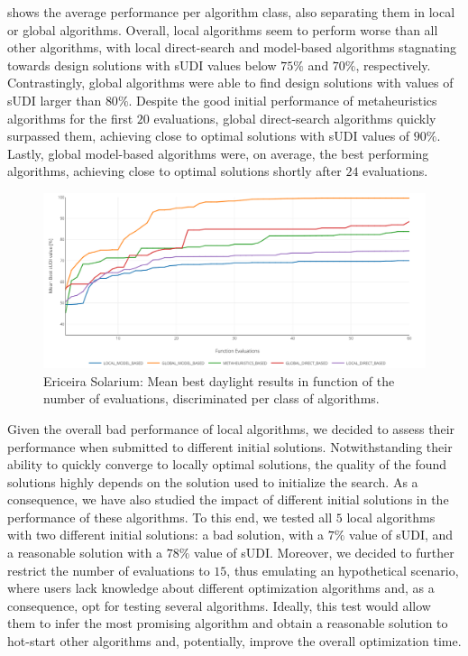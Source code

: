  shows the average performance per algorithm class, also separating them in local or global algorithms. Overall, local algorithms seem to perform worse than all other algorithms, with local direct-search and model-based algorithms stagnating towards design solutions with \ac{sUDI} values below $75\%$ and $70\%$, respectively. Contrastingly, global algorithms were able to find design solutions with values of \ac{sUDI} larger than $80\%$. Despite the good initial performance of metaheuristics algorithms for the first $20$ evaluations, global direct-search algorithms quickly surpassed them, achieving close to optimal solutions with \ac{sUDI} values of $90\%$. Lastly, global model-based algorithms were, on average, the best performing algorithms, achieving close to optimal solutions shortly after $24$ evaluations. 

\begin{figure}[htbp]
	\centering
	\includegraphics[width=1\textwidth]{Images/Evaluation/Ericeira_results_ph1_per_class.PNG}
	\caption[Ericeira Solarium: Mean best daylight results in function of the number of evaluations, discriminated per class of algorithms]{Ericeira Solarium: Mean best daylight results in function of the number of evaluations, discriminated per class of algorithms.}
	\label{fig:phase1results}
\end{figure}

Given the overall bad performance of local algorithms, we decided to assess their performance when submitted to different initial solutions. Notwithstanding their ability to quickly converge to locally optimal solutions, the quality of the found solutions highly depends on the solution used to initialize the search. As a consequence, we have also studied the impact of different initial solutions in the performance of these algorithms. To this end, we tested all $5$ local algorithms with two different initial solutions: a bad solution, with a $7\%$ value of \ac{sUDI}, and a reasonable solution with a $78\%$ value of \ac{sUDI}. Moreover, we decided to further restrict the number of evaluations to $15$, thus emulating an hypothetical scenario, where users lack knowledge about different optimization algorithms and, as a consequence, opt for testing several algorithms. Ideally, this test would allow them to infer the most promising algorithm and obtain a reasonable solution to hot-start other algorithms and, potentially, improve the overall optimization time.

